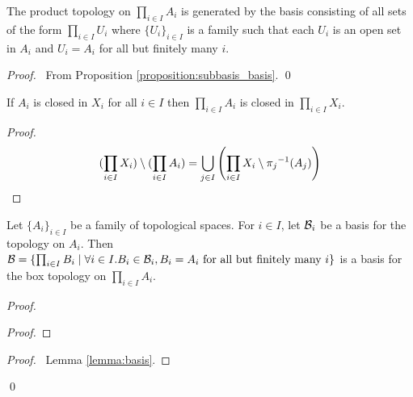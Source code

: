 \begin{proposition}
    \label{proposition:product_basis}
    The product topology on $\prod_{i \in I} A_i$ is generated by the basis consisting of all sets of the form $\prod_{i \in I} U_i$
    where $\{ U_i \}_{i \in I}$ is a family such that each $U_i$ is an open set in $A_i$ and $U_i = A_i$ for all but finitely many $i$.
\end{proposition}

\begin{proof}
    \pf\ From Proposition \ref{proposition:subbasis_basis}. \qed
\end{proof}

\begin{proposition}
    \label{proposition:closed_product}
    If $A_i$ is closed in $X_i$ for all $i \in I$ then $\prod_{i \in I} A_i$ is closed in $\prod_{i \in I} X_i$.
\end{proposition}

\begin{proof}
    \pf
    \[ (\prod_{i \in I} X_i) \setminus (\prod_{i \in I} A_i) = \bigcup_{j \in I} \left( \prod_{i \in I} X_i \setminus {\pi_j}^{-1}(A_j) \right) \relax \]
\end{proof}

\begin{proposition}
    Let $\{ A_i \}_{i \in I}$ be a family of topological spaces. For $i \in I$, let $\mathcal{B}_i$ be a basis for the topology on $A_i$. Then $\mathcal{B} = \{ \prod_{i \in I} B_i \mid
    \forall i \in I. B_i \in \mathcal{B}_i, B_i = A_i \text{ for all but finitely many } i \}$ is a basis for the box topology on $\prod_{i \in I} A_i$.
\end{proposition}

\begin{proof}
    \pf
    \begin{proof}
    \end{proof}
    \qedstep
    \begin{proof}
        \pf\ Lemma \ref{lemma:basis}.
    \end{proof}
    \qed
\end{proof}

